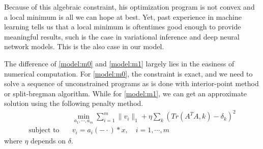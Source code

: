 \documentclass[a4paper]{article}
\begin{document}
Because of this algebraic constraint, his optimization program is not convex and a local minimum is all we can hope at best. Yet, past experience in machine learning tells us that a local minimum is oftentimes good enough to provide meaningful results, such is the case in variational inference and deep neural network models. This is the also case in our model.

The difference of \eqref{model:m0} and \eqref{model:m1} largely lies in the easiness of numerical computation. For \eqref{model:m0}, the constraint is exact, and we need to solve a sequence of unconstrained programs as is done with interior-point method or split-bregman algorithm. While for \eqref{model:m1}, we can get an approximate solution using the  following penalty method. 
\[
	\begin{aligned}
		&\min_{a_1,\cdots,a_m} \sum_{i=1}^m \|v_i\|_1 + \eta \sum_k (Tr(A^TA,k)-\delta_k)^2 \\
		\textrm{subject to} \quad &v_i = a_i(-\cdot)*x,\quad i=1,\cdots,m
	\end{aligned}
\]
where $\eta$ depends on $\delta$.
\end{document}
